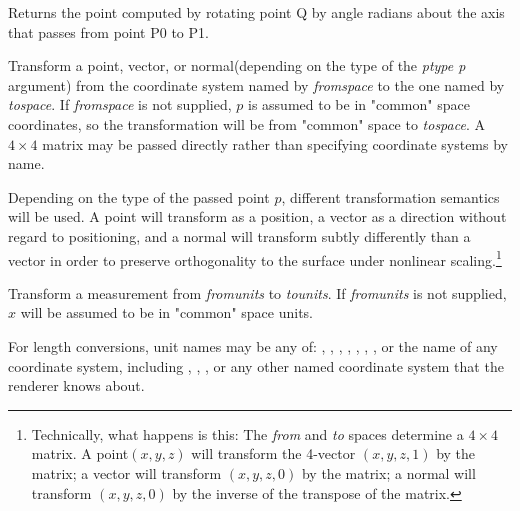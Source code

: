 \documentclass[11pt,letterpaper]{book}
\def\normal{{\cf normal}\xspace}
\def\point{{\cf point}\xspace}
\def\vector{{\cf vector}\xspace}
\def\commonspace{{\cf "common"} space\xspace}
\begin{document}
Returns the point computed by rotating point {\cf Q} by {\cf angle} 
radians about the axis that passes from point {\cf P0} to {\cf P1}.
\apiend


Transform a \point, \vector, or \normal (depending on the type of the
\emph{ptype p} argument) from the coordinate system named by
\emph{fromspace} to the one named by \emph{tospace}.  If 
\emph{fromspace} is not supplied, $p$ is assumed to be in \commonspace
coordinates, so the transformation will be from \commonspace to
\emph{tospace}.  A $4 \times 4$ matrix may be passed directly rather
than specifying coordinate systems by name.

Depending on the type of the passed point $p$, different transformation
semantics will be used.  A \point will transform as a position, a
\vector as a direction without regard to positioning, and a \normal will
transform subtly differently than a \vector in order to preserve
orthogonality to the surface under nonlinear
scaling.\footnote{Technically, what happens is this: The \emph{from} and
  \emph{to} spaces determine a $4 \times 4$ matrix.  A \point $(x,y,z)$
  will transform the 4-vector $(x,y,z,1)$ by the matrix; a \vector will
  transform $(x,y,z,0)$ by the matrix; a \normal will transform
  $(x,y,z,0)$ by the inverse of the transpose of the matrix.}

\apiend



Transform a measurement from \emph{fromunits} to \emph{tounits}.  If
\emph{fromunits} is not supplied, $x$ will be assumed to be in
\commonspace units.

For length conversions, unit names may be any of: , ,
, , , , , or the name of any
coordinate system, including , , , or
any other named coordinate system that the renderer knows about.
\end{document}

